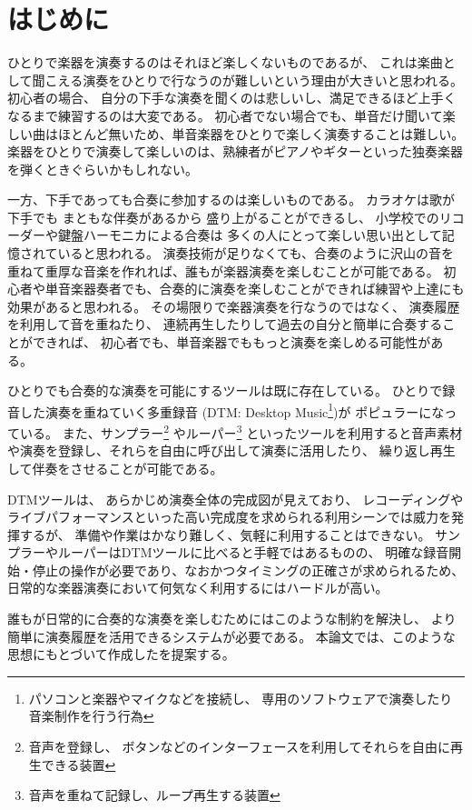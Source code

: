 %
%
\section{はじめに}
\label{sec:start}

ひとりで楽器を演奏するのはそれほど楽しくないものであるが、
これは楽曲として聞こえる演奏をひとりで行なうのが難しいという理由が大きいと思われる。
%
初心者の場合、 自分の下手な演奏を聞くのは悲しいし、満足できるほど上手くなるまで練習するのは大変である。
初心者でない場合でも、単音だけ聞いて楽しい曲はほとんど無いため、単音楽器をひとりで楽しく演奏することは難しい。
楽器をひとりで演奏して楽しいのは、熟練者がピアノやギターといった独奏楽器を弾くときぐらいかもしれない。

一方、下手であっても合奏に参加するのは楽しいものである。
カラオケは歌が下手でも
まともな伴奏があるから
盛り上がることができるし、
小学校でのリコーダーや鍵盤ハーモニカによる合奏は
多くの人にとって楽しい思い出として記憶されていると思われる。
演奏技術が足りなくても、合奏のように沢山の音を重ねて重厚な音楽を作れれば、誰もが楽器演奏を楽しむことが可能である。
初心者や単音楽器奏者でも、合奏的に演奏を楽しむことができれば練習や上達にも効果があると思われる。
%
その場限りで楽器演奏を行なうのではなく、
演奏履歴を利用して音を重ねたり、
連続再生したりして過去の自分と簡単に合奏することができれば、
初心者でも、単音楽器でももっと演奏を楽しめる可能性がある。

ひとりでも合奏的な演奏を可能にするツールは既に存在している。
%
ひとりで録音した演奏を重ねていく多重録音
(DTM: Desktop Music\footnote{パソコンと楽器やマイクなどを接続し、
    専用のソフトウェアで演奏したり音楽制作を行う行為})が
ポピュラーになっている\cite{jacob}\cite{resound}。
%
%
また、サンプラー\footnote{音声を登録し、
    ボタンなどのインターフェースを利用してそれらを自由に再生できる装置}
やルーパー\footnote{音声を重ねて記録し、ループ再生する装置}
といったツールを利用すると音声素材や演奏を登録し、それらを自由に呼び出して演奏に活用したり、
繰り返し再生して伴奏をさせることが可能である。

DTMツールは、
あらかじめ演奏全体の完成図が見えており、
レコーディングやライブパフォーマンスといった高い完成度を求められる利用シーンでは威力を発揮するが、
準備や作業はかなり難しく、気軽に利用することはできない。
%
サンプラーやルーパーはDTMツールに比べると手軽ではあるものの、
明確な録音開始・停止の操作が必要であり、なおかつタイミングの正確さが求められるため、
日常的な楽器演奏において何気なく利用するにはハードルが高い。

誰もが日常的に合奏的な演奏を楽しむためにはこのような制約を解決し、
より簡単に演奏履歴を活用できるシステムが必要である。
本論文では、このような思想にもとづいて作成した{\system}を提案する。
